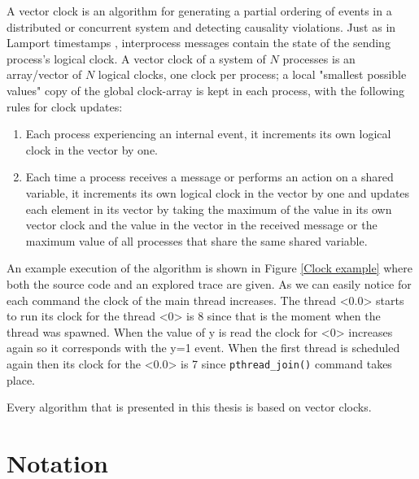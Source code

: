 A vector clock is an algorithm for generating a partial ordering of events in a distributed or concurrent system and detecting causality violations. 
Just as in Lamport timestamps \cite{Lamp}, interprocess messages contain the state of the sending process's logical clock. 
A vector clock of a system of $N$ processes is an array/vector of $N$ logical clocks, one clock per process; 
a local "smallest possible values" copy of the global clock-array is kept in each process, with the following rules for clock updates:

\begin{enumerate}
    \item Each process experiencing an internal event, it increments its own logical clock in the vector by one.
    \item Each time a process receives a message or performs an action on a shared variable, it increments its own logical clock in the vector by one and updates each element in its vector 
    by taking the maximum of the value in its own vector clock and the value in the vector in the received message or the maximum value of all processes that share
    the same shared variable.
\end{enumerate}

An example execution of the algorithm is shown in Figure \ref{Clock example} where both the source code and an explored trace are given.
As we can easily notice for each command the clock of the main thread increases. The thread <0.0> starts to run its clock for the thread <0> is 8 since 
that is the moment when the thread was spawned. When the value of y is read the clock for <0> increases again so it corresponds with the y=1 event. When the first thread is
scheduled again then its clock for the <0.0> is 7 since \verb|pthread_join()| command takes place.



Every algorithm that is presented in this thesis is based on vector clocks.


\section{Notation}

